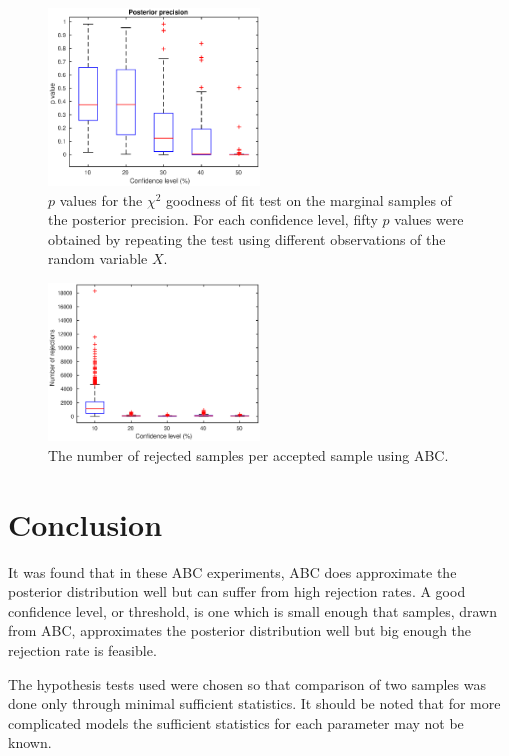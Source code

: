 \documentclass[a4paper,10pt]{article}
\begin{document}
\begin{figure}
\includegraphics[width=0.5\textwidth]{pvalue_precision.eps}
\caption{$p$ values for the $\chi^2$ goodness of fit test on the marginal samples of the posterior precision. For each confidence level, fifty $p$ values were obtained by repeating the test using different observations of the random variable $X$.}
\label{pvalue_precision}
\end{figure}

\begin{figure}
\includegraphics[width=0.5\textwidth]{rejections.eps}
\caption{The number of rejected samples per accepted sample using ABC.}
\label{rejections}
\end{figure}

\section{Conclusion}
It was found that in these ABC experiments, ABC does approximate the posterior distribution well but can suffer from high rejection rates. A good confidence level, or threshold, is one which is small enough that samples, drawn from ABC, approximates the posterior distribution well but big enough the rejection rate is feasible.

The hypothesis tests used were chosen so that comparison of two samples was done only through minimal sufficient statistics. It should be noted that for more complicated models the sufficient statistics for each parameter may not be known.
\end{document}
